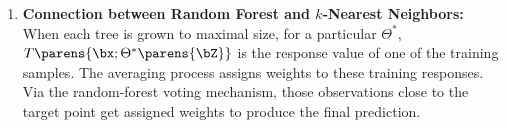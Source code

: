 \documentclass[12pt]{article}
\begin{document}
\begin{enumerate}[label=\textbf{\arabic*.}]
	\item \textbf{Connection between Random Forest and $k$-Nearest Neighbors:} When each tree is grown to maximal size, for a particular $\Theta^*$, $T \parens{\bx; \Theta^* \parens{\bZ}}$ is the response value of one of the training samples. The averaging process assigns weights to these training responses. Via the random-forest voting mechanism, those observations close to the target point get assigned weights to produce the final prediction. 
\end{enumerate}

\printbibliography
\end{document}
